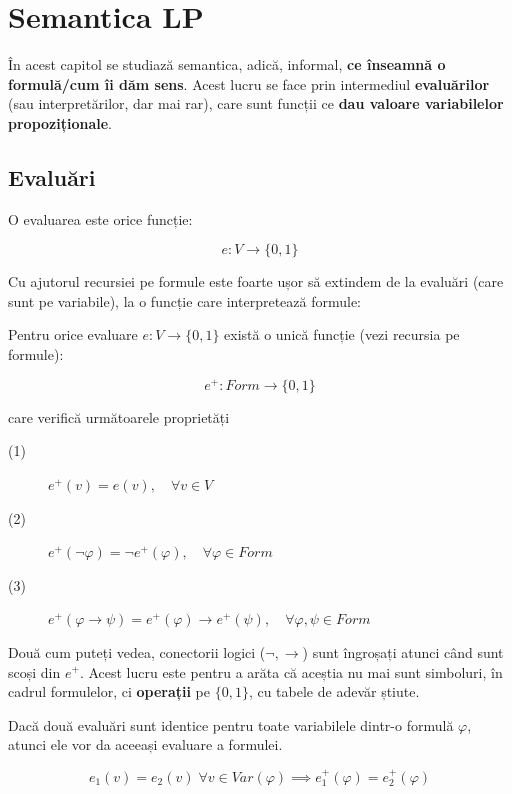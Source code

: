 \section{Semantica LP}

În acest capitol se studiază semantica, adică, informal, \textbf{ce înseamnă o formulă/cum îi dăm sens}. Acest lucru se face prin intermediul \textbf{evaluărilor}
(sau interpretărilor, dar mai rar), care sunt funcții ce \textbf{dau valoare variabilelor propoziționale}.

\subsection{Evaluări}

O evaluarea este orice funcție:

$$
	e : V \to \{0, 1 \}
$$

Cu ajutorul recursiei pe formule este foarte ușor să extindem de la evaluări (care sunt pe variabile), la o funcție care interpretează formule:

\begin{theorem}
	\label{th:eval}
	Pentru orice evaluare \( e : V \to \{0, 1 \} \)  există o unică funcție (vezi recursia pe formule):

	$$
		e^+ : Form \to \{ 0, 1 \}
	$$

	\noindent care verifică următoarele proprietăți

	\begin{description}
		\item[(1)]  \( e^+(v) = e(v), \quad \forall v \in V \)
		\item[(2)] \( e^+(\neg \varphi) = \bm{\neg} e^+(\varphi), \quad \forall \varphi \in Form  \)
		\item[(3)] \( e^+(\varphi \to \psi) = e^+(\varphi) \bm{\to} e^+(\psi), \quad \forall \varphi, \psi \in Form \)
	\end{description}
\end{theorem}


Două cum puteți vedea, conectorii logici (\( \neg, \to \)) sunt îngroșați atunci când sunt scoși din \( e^+ \). Acest lucru este pentru a
arăta că aceștia nu mai sunt simboluri, în cadrul formulelor, ci \textbf{operații} pe \( \{0, 1\} \), cu tabele de adevăr știute.

\begin{prop}
	\label{prop:eval_id}
	Dacă două evaluări sunt identice pentru toate variabilele dintr-o formulă \( \varphi \), atunci ele vor da aceeași evaluare a formulei.

	\[
		e_1(v) = e_2(v) \; \forall v \in Var(\varphi) \implies e_1^+(\varphi) = e_2^+(\varphi)
	\]
\end{prop}

